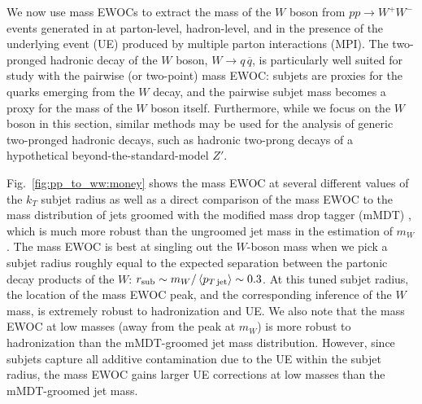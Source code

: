 \begin{table}
{
    }
    \caption[Shifts in the determination of \(m_W\) using mass EWOCs with different energy weightings.]{
        Shifts in the peaks of mass EWOCs with different energy weightings \(n\) due to detector effects or non-perturbative physics, presented in the style of Table \ref{tab:obs_comparison}.
        We observe that the determination of \(m_W\) is less robust to particle-level momentum smearing when using higher energy weights, but that higher energy weights are more robust to non-perturbative QCD effects.
    }
    \label{tab:energyweights}
\end{table}


We now use mass EWOCs to extract the mass of the \(W\) boson from \(pp \to W^+ W^-\) events generated in \pythia{} at parton-level, hadron-level, and in the presence of the underlying event (UE) produced by multiple parton interactions (MPI).
%
The two-pronged hadronic decay of the \(W\) boson, \(W \to q \,\overline{q}\), is particularly well suited for study with the pairwise (or two-point) mass EWOC:
%
subjets are proxies for the quarks emerging from the \(W\) decay, and the pairwise subjet mass becomes a proxy for the mass of the \(W\) boson itself.
%
Furthermore, while we focus on the \(W\) boson in this section, similar methods may be used for the analysis of generic two-pronged hadronic decays, such as hadronic two-prong decays of a hypothetical beyond-the-standard-model $Z'$.

Fig.~\ref{fig:pp_to_ww:money} shows the mass EWOC at several different values of the \(k_T\) subjet radius as well as a direct comparison of the mass EWOC to the mass distribution of jets groomed with the modified mass drop tagger (mMDT) \cite{Dasgupta:2013ihk,Larkoski:2014wba}, which is much more robust than the ungroomed jet mass in the estimation of \(m_W\).
%
The mass EWOC is best at singling out the \(W\)-boson mass when we pick a subjet radius roughly equal to the expected separation between the partonic decay products of the \(W\):
%
\(r_\text{sub} \sim m_W / \left\langle p_{T\,\text{jet}}\right\rangle\sim 0.3\).
%
At this tuned subjet radius, the location of the mass EWOC peak, and the corresponding inference of the \(W\) mass, is extremely robust to hadronization and UE.
%
We also note that the mass EWOC at low masses (away from the peak at \(m_W\)) is more robust to hadronization than the mMDT-groomed jet mass distribution.
%
However, since subjets capture all additive contamination due to the UE within the subjet radius, the mass EWOC gains larger UE corrections at low masses than the mMDT-groomed jet mass.

